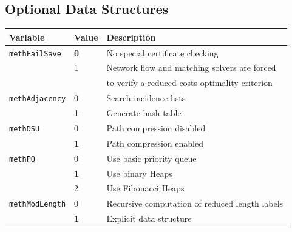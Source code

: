 \documentclass[a4paper,11pt,twoside]{book}
\begin{document}
\begin{multicols}{2}
\newpage
\subsection{Optional Data Structures}
\label{slb_options_data}
\medskip
\begin{center}
\begin{tabular}{|p{3cm}|p{1cm}|p{8cm}|}
\hline
{\bf Variable} & {\bf Value} & {\bf Description} \\
\hline
\hline
\verb/methFailSave/ & {\bf 0} & No special certificate checking \\
                    & 1 & Network flow and matching solvers are forced \\
                    &   & to verify a reduced costs optimality criterion \\
\hline
\verb/methAdjacency/& 0 & Search incidence lists \\
                    & {\bf 1} & Generate hash table \\
\hline
\verb/methDSU/      & 0 & Path compression disabled \\
                    & {\bf 1} & Path compression enabled \\
\hline
\verb/methPQ/       & 0 & Use basic priority queue \\
                    & {\bf 1} & Use binary Heaps \\
                    & 2 & Use Fibonacci Heaps \\
\hline
\verb/methModLength/& 0 & Recursive computation of reduced length labels \\
                    & {\bf 1} & Explicit data structure \\
\hline
\end{tabular}
\end{center}
\bigskip



\end{multicols}
\end{document}
